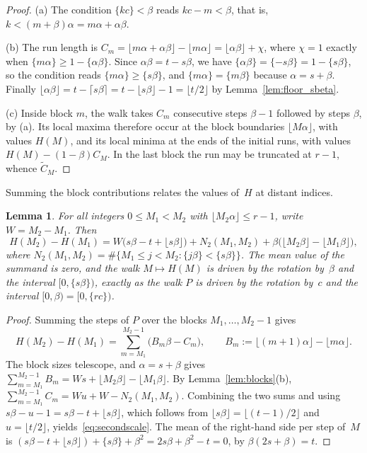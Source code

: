 \documentclass{birkjour}
\newtheorem{lemma}[theorem]{Lemma}
\theoremstyle{definition}
\theoremstyle{remark}
\newcommand{\fl}[1]{\lfloor #1 \rfloor}
\newcommand{\frc}[1]{\{ #1 \}}
\begin{document}
\begin{proof}
(a) The condition $\frc{kc}<\beta$ reads $kc-m<\beta$, that
is, $k<(m+\beta)\alpha=m\alpha+\alpha\beta$.

(b) The run length is
$C_{m}=\fl{m\alpha+\alpha\beta}-\fl{m\alpha}
=\fl{\alpha\beta}+\chi$, where $\chi=1$ exactly
when $\frc{m\alpha}\ge 1-\frc{\alpha\beta}$. Since
$\alpha\beta=t-s\beta$, we have
$\frc{\alpha\beta}=\frc{-s\beta}=1-\frc{s\beta}$, so the
condition reads $\frc{m\alpha}\ge\frc{s\beta}$, and
$\frc{m\alpha}=\frc{m\beta}$ because $\alpha=s+\beta$.
Finally
$\fl{\alpha\beta}=t-\lceil s\beta\rceil=t-\fl{s\beta}-1
=\fl{t/2}$ by Lemma~\ref{lem:floor_sbeta}.

(c) Inside block $m$, the walk takes $C_{m}$ consecutive
steps $\beta-1$ followed by steps $\beta$, by (a). Its local
maxima therefore occur at the block boundaries
$\fl{M\alpha}$, with values $H(M)$, and its local minima at
the ends of the initial runs, with values
$H(M)-(1-\beta)C_{M}$. In the last block the run may be
truncated at $r-1$, whence $\widetilde{C}_{M}$.
\end{proof}

Summing the block contributions relates the values of~$H$ at
distant indices.

\begin{lemma}\label{lem:secondscale}
For all integers $0\le M_{1}<M_{2}$ with
$\fl{M_{2}\alpha}\le r-1$, write $W=M_{2}-M_{1}$. Then
\begin{equation}\label{eq:secondscale}
  H(M_{2})-H(M_{1})
  =W\bigl(s\beta-t+\fl{s\beta}\bigr)
  +N_{2}(M_{1},M_{2})
  +\beta\bigl(\fl{M_{2}\beta}-\fl{M_{1}\beta}\bigr),
\end{equation}
where
$N_{2}(M_{1},M_{2})
=\#\{M_{1}\le j<M_{2}:\frc{j\beta}<\frc{s\beta}\}$.
The mean value of the summand is zero, and the walk
$M\mapsto H(M)$ is driven by the rotation by~$\beta$ and the
interval $[0,\frc{s\beta})$, exactly as the walk $P$ is
driven by the rotation by~$c$ and the interval
$[0,\beta)=[0,\frc{rc})$.
\end{lemma}

\begin{proof}
Summing the steps of $P$ over the blocks
$M_{1},\ldots,M_{2}-1$ gives
\[
  H(M_{2})-H(M_{1})
  =\sum_{m=M_{1}}^{M_{2}-1}\bigl(B_{m}\beta-C_{m}\bigr),
  \qquad
  B_{m}:=\fl{(m{+}1)\alpha}-\fl{m\alpha}.
\]
The block sizes telescope, and $\alpha=s+\beta$ gives
$\sum_{m=M_{1}}^{M_{2}-1}B_{m}
=Ws+\fl{M_{2}\beta}-\fl{M_{1}\beta}$.
By Lemma~\ref{lem:blocks}(b),
$\sum_{m=M_{1}}^{M_{2}-1}C_{m}
=Wu+W-N_{2}(M_{1},M_{2})$.
Combining the two sums and using
$s\beta-u-1=s\beta-t+\fl{s\beta}$, which follows from
$\fl{s\beta}=\fl{(t-1)/2}$ and $u=\fl{t/2}$,
yields~\eqref{eq:secondscale}. The mean of the right-hand side
per step of~$M$ is
$(s\beta-t+\fl{s\beta})+\frc{s\beta}+\beta^{2}
=2s\beta+\beta^{2}-t=0$, by $\beta(2s+\beta)=t$.
\end{proof}
\end{document}
